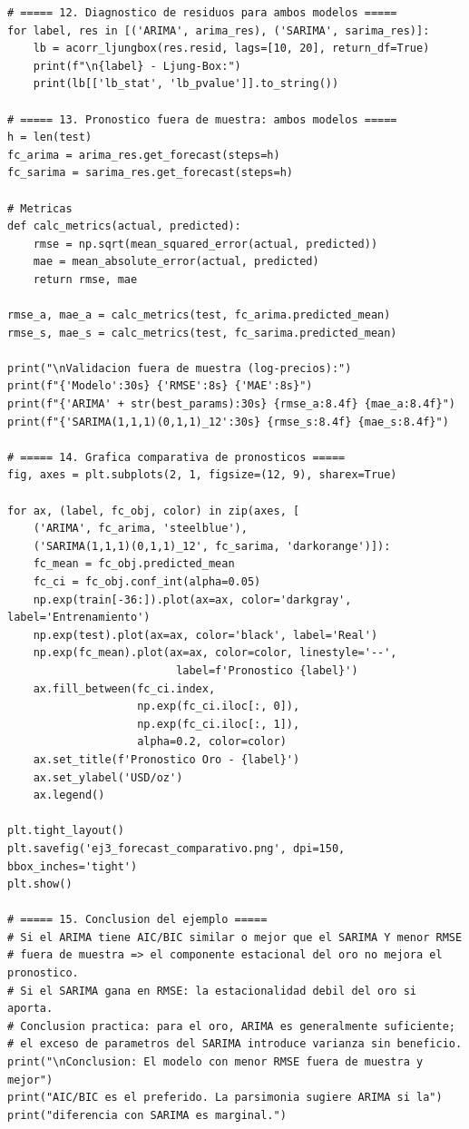 \documentclass[12pt,a4paper]{article}
\theoremstyle{definition}
\begin{document}
\begin{lstlisting}[style=python, caption={Ejemplo 3: Comparacion ARIMA vs.\ SARIMA - Oro}]
# ===== 12. Diagnostico de residuos para ambos modelos =====
for label, res in [('ARIMA', arima_res), ('SARIMA', sarima_res)]:
    lb = acorr_ljungbox(res.resid, lags=[10, 20], return_df=True)
    print(f"\n{label} - Ljung-Box:")
    print(lb[['lb_stat', 'lb_pvalue']].to_string())

# ===== 13. Pronostico fuera de muestra: ambos modelos =====
h = len(test)
fc_arima = arima_res.get_forecast(steps=h)
fc_sarima = sarima_res.get_forecast(steps=h)

# Metricas
def calc_metrics(actual, predicted):
    rmse = np.sqrt(mean_squared_error(actual, predicted))
    mae = mean_absolute_error(actual, predicted)
    return rmse, mae

rmse_a, mae_a = calc_metrics(test, fc_arima.predicted_mean)
rmse_s, mae_s = calc_metrics(test, fc_sarima.predicted_mean)

print("\nValidacion fuera de muestra (log-precios):")
print(f"{'Modelo':30s} {'RMSE':8s} {'MAE':8s}")
print(f"{'ARIMA' + str(best_params):30s} {rmse_a:8.4f} {mae_a:8.4f}")
print(f"{'SARIMA(1,1,1)(0,1,1)_12':30s} {rmse_s:8.4f} {mae_s:8.4f}")

# ===== 14. Grafica comparativa de pronosticos =====
fig, axes = plt.subplots(2, 1, figsize=(12, 9), sharex=True)

for ax, (label, fc_obj, color) in zip(axes, [
    ('ARIMA', fc_arima, 'steelblue'),
    ('SARIMA(1,1,1)(0,1,1)_12', fc_sarima, 'darkorange')]):
    fc_mean = fc_obj.predicted_mean
    fc_ci = fc_obj.conf_int(alpha=0.05)
    np.exp(train[-36:]).plot(ax=ax, color='darkgray', label='Entrenamiento')
    np.exp(test).plot(ax=ax, color='black', label='Real')
    np.exp(fc_mean).plot(ax=ax, color=color, linestyle='--',
                          label=f'Pronostico {label}')
    ax.fill_between(fc_ci.index,
                    np.exp(fc_ci.iloc[:, 0]),
                    np.exp(fc_ci.iloc[:, 1]),
                    alpha=0.2, color=color)
    ax.set_title(f'Pronostico Oro - {label}')
    ax.set_ylabel('USD/oz')
    ax.legend()

plt.tight_layout()
plt.savefig('ej3_forecast_comparativo.png', dpi=150, bbox_inches='tight')
plt.show()

# ===== 15. Conclusion del ejemplo =====
# Si el ARIMA tiene AIC/BIC similar o mejor que el SARIMA Y menor RMSE
# fuera de muestra => el componente estacional del oro no mejora el pronostico.
# Si el SARIMA gana en RMSE: la estacionalidad debil del oro si aporta.
# Conclusion practica: para el oro, ARIMA es generalmente suficiente;
# el exceso de parametros del SARIMA introduce varianza sin beneficio.
print("\nConclusion: El modelo con menor RMSE fuera de muestra y mejor")
print("AIC/BIC es el preferido. La parsimonia sugiere ARIMA si la")
print("diferencia con SARIMA es marginal.")
\end{lstlisting}
\end{document}
